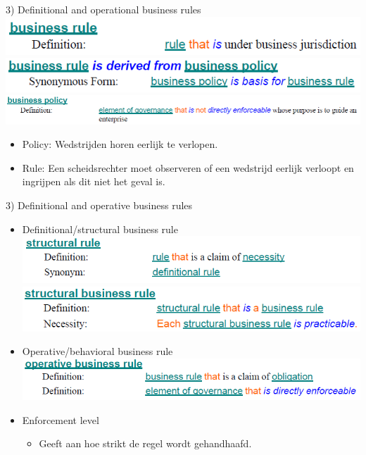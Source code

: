 \documentclass[t,12pt,english
\ifx\beamermode\undefined\else,\beamermode\fi
]{beamer}
\begin{document}
\begin{frame}{3) Definitional and operational business rules}
	\includegraphics[width=0.7\linewidth]{assets/businessRule} \\
	\includegraphics[width=0.7\linewidth]{assets/businessRuleDerived} \\
	\includegraphics[width=\linewidth]{assets/businessPolicy}
	
	\begin{example}
		\begin{itemize}
			\item Policy: Wedstrijden horen eerlijk te verlopen.
			\item Rule: Een scheidsrechter moet observeren of een wedstrijd eerlijk verloopt en ingrijpen als dit niet het geval is.
		\end{itemize}
	\end{example}
\end{frame}

\begin{frame}{3) Definitional and operative business rules}
	\begin{itemize}
		\item Definitional/structural business rule
		\includegraphics[width=0.7\linewidth]{assets/structuralRule} \\
		\includegraphics[width=0.7\linewidth]{assets/structuralBusinessRule}
		
		\item Operative/behavioral business rule
		\includegraphics[width=0.7\linewidth]{assets/operativeBusinessRule}
		
		\item Enforcement level
		\begin{itemize}
			\item Geeft aan hoe strikt de regel wordt gehandhaafd.
		\end{itemize}
	\end{itemize}
\end{frame}

\begin{frame}
	\vfill
	\vfill
\end{frame}
\end{document}
